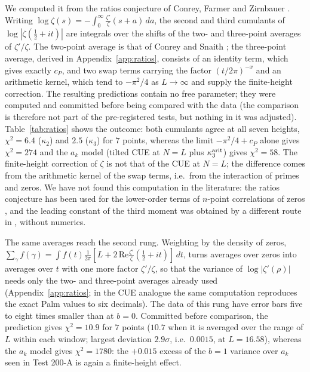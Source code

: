 \documentclass[12pt]{amsart}
\theoremstyle{remark}
\newcommand{\1}{\mathbf{1}}
\begin{document}
We computed it from the ratios conjecture of Conrey, Farmer and Zirnbauer
\cite{CFZ08}. Writing $\log\zeta(s)=-\int_0^\infty\frac{\zeta'}\zeta(s+a)\,da$,
the second and third cumulants of $\log|\zeta(\frac12+it)|$ are integrals
over the shifts of the two- and three-point averages of $\zeta'/\zeta$.
The two-point average is that of Conrey and Snaith \cite{CS07}; the
three-point average, derived in Appendix~\ref{app:ratios}, consists of an
identity term, which gives exactly $c_P$, and two swap terms carrying the
factor $(t/2\pi)^{-x}$ and an arithmetic kernel, which tend to $-\pi^2/4$
as $L\to\infty$ and supply the finite-height correction. The resulting
predictions contain no free parameter; they were computed and committed
before being compared with the data (the comparison is therefore not part
of the pre-registered tests, but nothing in it was adjusted).
Table~\ref{tab:ratios} shows the outcome: both cumulants agree at all seven
heights, $\chi^2=6.4$ ($\kappa_2$) and $2.5$ ($\kappa_3$) for $7$ points,
whereas the limit $-\pi^2/4+c_P$ alone gives $\chi^2=274$ and the $a_k$
model (tilted CUE at $N=L$ plus $\kappa_3^{\rm arit}$) gives $\chi^2=58$.
The finite-height correction of $\zeta$ is not that of the CUE at $N=L$;
the difference comes from the arithmetic kernel of the swap terms, i.e.\
from the interaction of primes and zeros. We have not found this
computation in the literature: the ratios conjecture has been used for the
lower-order terms of $n$-point correlations of zeros \cite{CS08}, and the
leading constant of the third moment was obtained by a different route in
\cite{FG24}, without numerics.

The same averages reach the second rung. Weighting by the density of zeros,
$\sum_\gamma f(\gamma)=\int f(t)\frac1{2\pi}[L+2\,\mathrm{Re}\frac{\zeta'}{\zeta}
(\frac12+it)]\,dt$, turns averages over zeros into averages over $t$ with one
more factor $\zeta'/\zeta$, so that the variance of $\log|\zeta'(\rho)|$ needs
only the two- and three-point averages already used (Appendix~\ref{app:ratios};
in the CUE analogue the same computation reproduces the exact Palm values
to six decimals). The data of this rung have error bars five to eight times
smaller than at $b=0$. Committed before comparison, the prediction gives
$\chi^2=10.9$ for $7$ points ($10.7$ when it is averaged over the range of
$L$ within each window; largest deviation $2.9\sigma$, i.e.\ $0.0015$, at
$L=16.58$), whereas the $a_k$ model gives $\chi^2=1780$: the $+0.015$ excess of
the $b=1$ variance over $a_k$ seen in Test 200-A is again a finite-height
effect.
\end{document}
